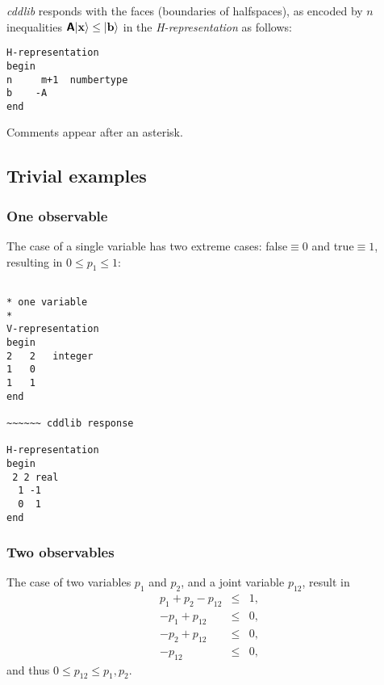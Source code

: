\documentclass[%
 showpacs,
 showkeys,
 preprintnumbers,
 amsmath,amssymb,
 aps,
  pra,
  longbibliography,
 floatfix,
 ]{revtex4-1}
\begin{document}

{\em cddlib} responds with the faces (boundaries of halfspaces), as encoded by  $n$  inequalities $ \textsf{\textbf{A}} \vert {\bf x} \rangle   \le \vert {\bf b} \rangle $
in the  {\em H-representation} as follows:

{\begin{lstlisting}[backgroundcolor=\color{yellow!10},framerule=0pt,breaklines=true, frame=tb]
H-representation
begin
n     m+1  numbertype
b    -A
end
\end{lstlisting}  }

Comments appear after an asterisk.


\subsection{Trivial examples}
\label{2017-b-teap}


\subsubsection{One observable}
\label{2017-b-ooa}


The case of a single variable has two extreme cases: false$\equiv 0$ and true$\equiv 1$,
resulting in $0\le p_1 \le 1$:

{ \begin{lstlisting}[backgroundcolor=\color{yellow!10},framerule=0pt,breaklines=true, frame=tb]

* one variable
*
V-representation
begin
2   2   integer
1   0
1   1
end

~~~~~~ cddlib response

H-representation
begin
 2 2 real
  1 -1
  0  1
end

\end{lstlisting}  }

\subsubsection{Two observables}
\label{2017-b-toa}

The case of two variables $p_1$ and $p_2$, and a joint variable $p_{12}$,
result in
\begin{eqnarray}
p_1 + p_2 - p_{12} &\le& 1,
\\
- p_1 + p_{12} &\le& 0,
\\
- p_2 + p_{12} &\le& 0,
\\
- p_{12} &\le& 0,
\label{2017-b-1-2-p-ca}
\end{eqnarray}
and thus $0  \le  p_{12}  \le  p_1 , p_2$.
\end{document}
